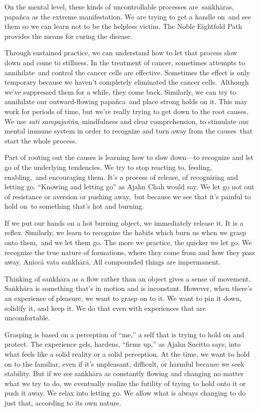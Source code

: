 On the mental level, these kinds of uncontrollable processes are~saṅkhāras, papañca as the extreme manifestation. We are trying to get a handle on~and see them so we can learn not to be the helpless victim. The Noble Eightfold Path provides the means for curing the disease.

Through sustained practice, we can understand how to let that process slow down and come to stillness. In the treatment of cancer, sometimes attempts to annihilate~and control the cancer cells are effective. Sometimes the effect is only temporary because we haven't completely eliminated the cancer cells.~Although we've suppressed them for a while, they come back. Similarly, we can try to annihilate our outward-flowing papañca~and place strong holds on it. This may work for periods of time, but we're really trying to get down to the root causes. We use \emph{sati} \emph{sampajañña}, mindfulness and clear comprehension, to stimulate our mental immune system in order to recognize and turn away from the causes~that start the whole process.

Part of rooting out the causes is learning how to slow down---to recognize and let go of the underlying tendencies. We try to stop reacting to, feeding, enabling,~and encouraging them. It's a process of release, of recognizing and letting go. ``Knowing and letting go'' as Ajahn Chah would say. We let go not out of resistance or aversion or pushing away,~but because we see that it's painful to hold on~to something that's hot and burning.

If we put our hands on a hot burning object, we immediately release it. It is a reflex. Similarly, we learn to recognize the habits which burn us when we grasp onto them,~and we let them go. The more we practice, the quicker we let go. We recognize the true nature of formations, where they come from and how they pass away. Aniccā vata saṅkhārā. All compounded things are impermanent.

Thinking of saṅkhāra as a flow rather than an object gives a sense of movement. Saṅkhāra is something that's in motion and is inconstant. However, when there's an experience of pleasure, we want to grasp on to it. We want to pin it down, solidify it, and keep it. We do that even with experiences that are uncomfortable.~

Grasping is based on a perception of ``me,'' a self that is trying to hold on and protect. The experience gels, hardens, ``firms up,'' as Ajahn Sucitto says, into what feels like a solid reality or a solid perception. At the time, we want to hold on to the familiar, even if it's unpleasant, difficult, or harmful because we seek stability. But if we see saṅkhāra as constantly flowing and changing no matter what we try to do, we eventually realize the futility of trying to hold onto it or push it away. We relax into letting go. We allow what is always changing to do just that, according to its own nature.

